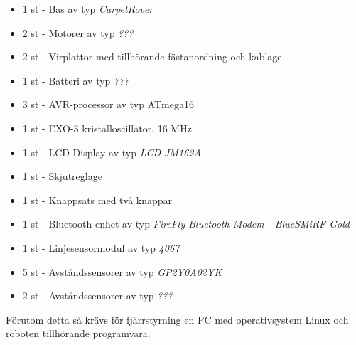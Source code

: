 %

\begin{itemize}

\item 1 st - Bas av typ \emph{CarpetRover}
\item 2 st - Motorer av typ \emph{???}
\item 2 st - Virplattor med tillhörande fästanordning och kablage
\item 1 st - Batteri av typ \emph{???}
\item 3 st - AVR-processor av typ ATmega16
\item 1 st - EXO-3 kristalloscillator, 16 MHz
\item 1 st - LCD-Display av typ \emph{LCD JM162A}
\item 1 st - Skjutreglage
\item 1 st - Knappsats med två knappar
\item 1 st - Bluetooth-enhet av typ \emph{FireFly Bluetooth Modem - BlueSMiRF Gold}
\item 1 st - Linjesensormodul av typ \emph{4067}
\item 5 st - Avståndssensorer av typ \emph{GP2Y0A02YK}
\item 2 st - Avståndssensorer av typ \emph{???}

\end{itemize}

Förutom detta så krävs för fjärrstyrning en PC med operativsystem Linux och roboten tillhörande
programvara. 

